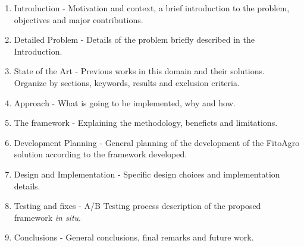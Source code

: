 \begin{enumerate}
	\item Introduction - Motivation and context, a brief introduction to the problem, objectives and major contributions.
	\item Detailed Problem - Details of the problem briefly described in the Introduction.
	\item State of the Art - Previous works in this domain and their solutions. Organize by sections, keywords, results and exclusion criteria.
	\item Approach - What is going to be implemented, why and how.
	\item The framework - Explaining the methodology, beneficts and limitations.
	\item Development Planning - General planning of the development of the FitoAgro solution according to the framework developed.
	\item Design and Implementation - Specific design choices and implementation details.
	\item Testing and fixes - A/B Testing process description of the proposed framework \textit{in situ}.
	\item Conclusions - General conclusions, final remarks and future work.
\end{enumerate}

